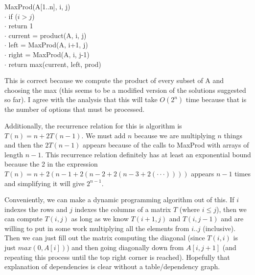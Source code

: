 \documentclass{article}
\begin{document}
\begin{enumerate}
        \begin{algorithm}
            MaxProd(A[1..n], i, j) \\
            $\cdot$ \hspace{1em} if ($i > j$) \\
            $\cdot$ \hspace{2em} return 1 \\
            $\cdot$ \hspace{1em} current = product(A, i, j) \\
            $\cdot$ \hspace{1em} left    = MaxProd(A, i+1, j) \\
            $\cdot$ \hspace{1em} right   = MaxProd(A, i, j-1) \\
            $\cdot$ \hspace{1em} return max(current, left, prod)
        \end{algorithm}

        This is correct because we compute the product of every subset of A and choosing the max (this seems to be a modified version of the solutions suggested so far). I agree with the analysis that this will take $O (2^n)$ time because that is the number of options that must be processed.

        Additionally, the recurrence relation for this is algorithm is $T(n) = n + 2T(n-1)$. We must add $n$ because we are multiplying $n$ things and then the $2T(n-1)$ appears because of the calls to MaxProd with arrays of length $n-1$. This recurrence relation definitely has at least an exponential bound because the 2 in the expression $T(n) = n + 2(n-1+2(n-2+2(n-3 + 2(\cdot \cdot \cdot))))$ appears $n-1$ times and simplifying it will give $2^{n-1}$.

        Conveniently, we can make a dynamic programming algorithm out of this. If $i$ indexes the rows and $j$ indexes the columns of a matrix $T$ (where $i \leq j$), then we can compute $T(i, j)$ as long as we know $T(i+1, j)$ and $T(i, j-1)$ and are willing to put in some work multiplying all the elements from $i..j$ (inclusive). Then we can just fill out the matrix computing the diagonal (since $T(i, i)$ is just $max (0, A[i])$) and then going diagonally down from $A[i, j+1]$ (and repeating this process until the top right corner is reached). Hopefully that explanation of dependencies is clear without a table/dependency graph.


\end{enumerate}
\end{document}
